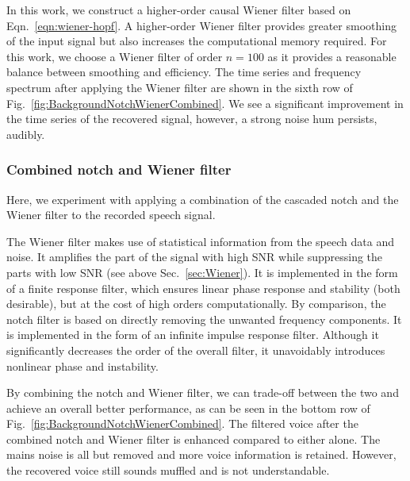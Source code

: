 \documentclass[paper-main.tex]{subfiles}
\begin{document}
In this work, we construct a higher-order causal Wiener filter based on Eqn.~\ref{eqn:wiener-hopf}. A higher-order Wiener filter provides greater smoothing of the input signal but also increases the computational memory required. For this work, we choose a Wiener filter of order $n=100$ as it provides a reasonable balance between smoothing and efficiency. The time series and frequency spectrum after applying the Wiener filter are shown in the sixth row of Fig.~\ref{fig:BackgroundNotchWienerCombined}.
We see a significant improvement in the time series of the recovered signal, however, a strong noise hum persists, audibly. 


\subsubsection{Combined notch and Wiener filter}

Here, we experiment with applying a combination of the cascaded notch and the Wiener filter to the recorded speech signal. 


The Wiener filter makes use of statistical information from the speech data and noise. It amplifies the part of the signal with high SNR while suppressing the parts with low SNR (see above Sec.~\ref{sec:Wiener}). It is implemented in the form of a finite response filter, which ensures linear phase response and stability (both desirable), but at the cost of high orders computationally. By comparison, the notch filter is based on directly removing the unwanted frequency components. It is implemented in the form of an infinite impulse response filter. Although it significantly decreases the order of the overall filter, it unavoidably introduces nonlinear phase and instability. 


By combining the notch and Wiener filter, we can trade-off between the two and achieve an overall better performance, as can be seen in the bottom row of Fig.~\ref{fig:BackgroundNotchWienerCombined}.
The filtered voice after the combined notch and Wiener filter is enhanced compared to either alone. The mains noise is all but removed and more voice information is retained. However, the recovered voice still sounds muffled and is not understandable.
\end{document}
